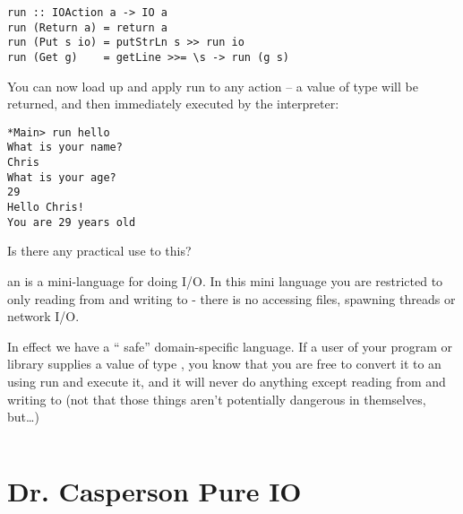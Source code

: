 \documentclass[thesis-solanki.tex]{subfiles}
\begin{document}
\begin{verbatim}
run :: IOAction a -> IO a
run (Return a) = return a
run (Put s io) = putStrLn s >> run io
run (Get g)    = getLine >>= \s -> run (g s)
\end{verbatim}

You can now load up  and apply run to any action –
a value of type   will be returned, and then immediately executed by the 
interpreter:

\begin{verbatim}
*Main> run hello
What is your name?
Chris
What is your age?
29
Hello Chris!
You are 29 years old

\end{verbatim}
Is there any practical use to this?

an  is a mini-language for doing I/O. In this mini language you are restricted to only reading from  and writing to  -
there is no accessing files, spawning threads or network I/O.

In effect we have a “
safe” domain-specific language.
If a user of your program or library supplies a value of type  , you know that you are free to convert it to an   using run and execute it, 
and it will never do anything except reading from  and writing to  (not that those things aren’t potentially dangerous in themselves, but…)


\begin{singlespace}
  \inputminted[linenos]{haskell}{haskell-proto4-purvey-wincer.hs}
\end{singlespace}

\section{Dr. Casperson Pure IO}
\begin{singlespace}
  \inputminted[linenos]{haskell}{haskell-proto4-myrtle-uppers.hs}
\end{singlespace}
\end{document}
